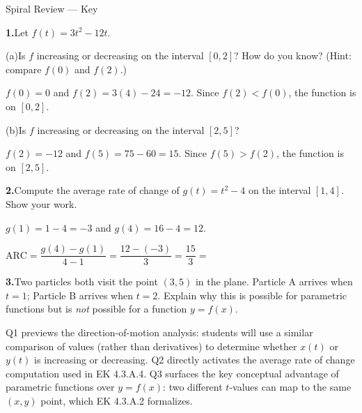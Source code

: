 \documentclass[10pt]{article}
\begin{document}
\namedateperiod

\vspace{0.12in}

\begin{notesbox}{Spiral Review --- Key}

\textbf{1.}\quad Let $f(t) = 3t^2 - 12t$.

\vspace{4pt}
(a)\quad Is $f$ increasing or decreasing on the interval $[0, 2]$?
How do you know? (Hint: compare $f(0)$ and $f(2)$.)

\vspace{4pt}
$f(0) = 0$ and $f(2) = 3(4) - 24 = -12$. Since $f(2) < f(0)$, the function is
 on $[0, 2]$.

\vspace{0.10in}
(b)\quad Is $f$ increasing or decreasing on the interval $[2, 5]$?

\vspace{4pt}
$f(2) = -12$ and $f(5) = 75 - 60 = 15$. Since $f(5) > f(2)$, the function is
 on $[2, 5]$.

\vspace{0.14in}
\textbf{2.}\quad Compute the average rate of change of $g(t) = t^2 - 4$
on the interval $[1, 4]$. Show your work.

\vspace{4pt}
$g(1) = 1 - 4 = -3$ and $g(4) = 16 - 4 = 12$.

$\text{ARC} = \dfrac{g(4) - g(1)}{4 - 1} = \dfrac{12 - (-3)}{3} = \dfrac{15}{3} =$ 

\vspace{0.14in}
\textbf{3.}\quad Two particles both visit the point $(3, 5)$ in the plane.
Particle A arrives when $t = 1$; Particle B arrives when $t = 2$.
Explain why this is possible for parametric functions but is
\emph{not} possible for a function $y = f(x)$.

\vspace{4pt}

\begin{teachernote}
  Q1 previews the direction-of-motion analysis: students will use a similar
  comparison of values (rather than derivatives) to determine whether $x(t)$
  or $y(t)$ is increasing or decreasing. Q2 directly activates the average
  rate of change computation used in EK 4.3.A.4. Q3 surfaces the key
  conceptual advantage of parametric functions over $y = f(x)$: two different
  $t$-values can map to the same $(x, y)$ point, which EK 4.3.A.2 formalizes.
\end{teachernote}

\end{notesbox}
\end{document}
